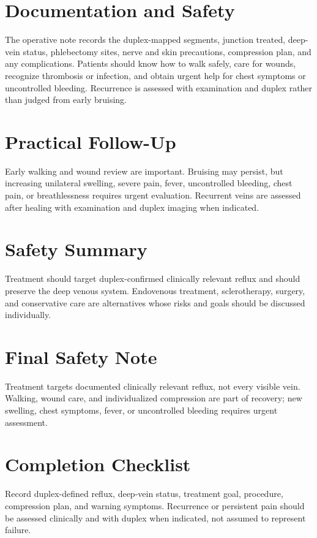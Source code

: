 \section*{Documentation and Safety}
The operative note records the duplex-mapped segments, junction treated, deep-vein status, phlebectomy sites, nerve and skin precautions, compression plan, and any complications. Patients should know how to walk safely, care for wounds, recognize thrombosis or infection, and obtain urgent help for chest symptoms or uncontrolled bleeding. Recurrence is assessed with examination and duplex rather than judged from early bruising.

\section*{Practical Follow-Up}
Early walking and wound review are important. Bruising may persist, but increasing unilateral swelling, severe pain, fever, uncontrolled bleeding, chest pain, or breathlessness requires urgent evaluation. Recurrent veins are assessed after healing with examination and duplex imaging when indicated.

\section*{Safety Summary}
Treatment should target duplex-confirmed clinically relevant reflux and should preserve the deep venous system. Endovenous treatment, sclerotherapy, surgery, and conservative care are alternatives whose risks and goals should be discussed individually.

\section*{Final Safety Note}
Treatment targets documented clinically relevant reflux, not every visible vein. Walking, wound care, and individualized compression are part of recovery; new swelling, chest symptoms, fever, or uncontrolled bleeding requires urgent assessment.

\section*{Completion Checklist}
Record duplex-defined reflux, deep-vein status, treatment goal, procedure, compression plan, and warning symptoms. Recurrence or persistent pain should be assessed clinically and with duplex when indicated, not assumed to represent failure.

